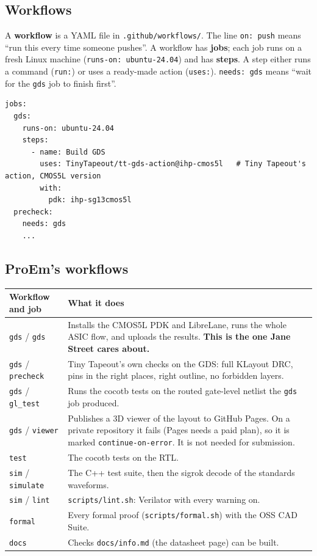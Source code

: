 \documentclass[11pt,a4paper]{article}
\newcommand{\file}[1]{\texttt{#1}}
\newcommand{\cmd}[1]{\texttt{#1}}
\begin{document}
\subsection{Workflows}

A \textbf{workflow} is a YAML file in \file{.github/workflows/}. The line \texttt{on: push} means ``run this every time someone pushes''. A workflow has \textbf{jobs}; each job runs on a fresh Linux machine (\texttt{runs-on: ubuntu-24.04}) and has \textbf{steps}. A step either runs a command (\texttt{run:}) or uses a ready-made action (\texttt{uses:}). \texttt{needs: gds} means ``wait for the \texttt{gds} job to finish first''.

\begin{lstlisting}
jobs:
  gds:
    runs-on: ubuntu-24.04
    steps:
      - name: Build GDS
        uses: TinyTapeout/tt-gds-action@ihp-cmos5l   # Tiny Tapeout's action, CMOS5L version
        with:
          pdk: ihp-sg13cmos5l
  precheck:
    needs: gds
    ...
\end{lstlisting}

\subsection{ProEm's workflows}

\begin{center}
\begin{tabularx}{\linewidth}{@{}lL@{}}
\toprule
Workflow and job & What it does \\
\midrule
\cmd{gds} / \texttt{gds} & Installs the CMOS5L PDK and LibreLane, runs the whole ASIC flow, and uploads the results. \textbf{This is the one Jane Street cares about.} \\
\cmd{gds} / \texttt{precheck} & Tiny Tapeout's own checks on the GDS: full KLayout DRC, pins in the right places, right outline, no forbidden layers. \\
\cmd{gds} / \texttt{gl\_test} & Runs the cocotb tests on the routed gate-level netlist the \texttt{gds} job produced. \\
\cmd{gds} / \texttt{viewer} & Publishes a 3D viewer of the layout to GitHub Pages. On a private repository it fails (Pages needs a paid plan), so it is marked \texttt{continue-on-error}. It is not needed for submission. \\
\cmd{test} & The cocotb tests on the RTL. \\
\cmd{sim} / \texttt{simulate} & The C++ test suite, then the sigrok decode of the standards waveforms. \\
\cmd{sim} / \texttt{lint} & \file{scripts/lint.sh}: Verilator with every warning on. \\
\cmd{formal} & Every formal proof (\file{scripts/formal.sh}) with the OSS CAD Suite. \\
\cmd{docs} & Checks \file{docs/info.md} (the datasheet page) can be built. \\
\bottomrule
\end{tabularx}
\end{center}
\end{document}

